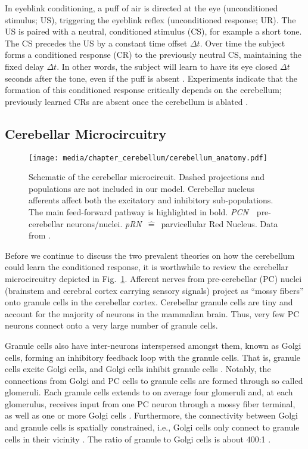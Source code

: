 In eyeblink conditioning, a puff of air is directed at the eye (unconditioned stimulus; US), triggering the eyeblink reflex (unconditioned response; UR). The US is paired with a neutral, conditioned stimulus (CS), for example a short tone. The CS precedes the US by a constant time offset $\Delta t$. Over time the subject forms a conditioned response (CR) to the previously neutral CS, maintaining the fixed delay $\Delta t$. In other words, the subject will learn to have its eye closed $\Delta t$ seconds after the tone, even if the puff is absent \citep[cf.][]{heiney2014cerebellardependent}. Experiments indicate that the formation of this conditioned response critically depends on the cerebellum; previously learned CRs are absent once the cerebellum is ablated \citep{mccormick1981engram}.

\subsection{Cerebellar Microcircuitry}

\begin{figure}[t]
	\centering
	\texttt{[image: media/chapter\_cerebellum/cerebellum\_anatomy.pdf]}
	\caption[Schematic of the cerebellar microcircuit.]{Schematic of the cerebellar microcircuit. Dashed projections and populations are not included in our model. Cerebellar nucleus afferents affect both the excitatory and inhibitory sub-populations.  The main feed-forward pathway is highlighted in bold. \emph{PCN}~\correspondsTo~pre-cerebellar neurons/nuclei. \emph{pRN}~$\hat =$~parvicellular Red Nucleus. Data from \protect\citet{ito2010cerebellar,llinas2010olivocerebellar}.}
	\label{fig:cerebellum_anatomy}
\end{figure}

Before we continue to discuss the two prevalent theories on how the cerebellum could learn the conditioned response, it is worthwhile to review the cerebellar microcircuitry depicted in Fig.~\ref{fig:cerebellum_anatomy}.
Afferent nerves from pre-cerebellar (PC) nuclei (brainstem and cerebral cortex carrying sensory signals) project as \enquote{mossy fibers} onto granule cells in the cerebellar cortex.
Cerebellar granule cells are tiny and account for the majority of neurons in the mammalian brain. Thus, very few PC neurons connect onto a very large number of granule cells.

Granule cells also have inter-neurons interspersed amongst them, known as Golgi cells, forming an inhibitory feedback loop with the granule cells. That is, granule cells excite Golgi cells, and Golgi cells inhibit granule cells \citep{ito2010cerebellar}.
Notably, the connections from Golgi and PC cells to granule cells are formed through so called glomeruli. Each granule cells extends to on average four glomeruli and, at each glomerulus, receives input from one PC neuron through a mossy fiber terminal, as well as one or more Golgi cells \citep{palkovits1972quantitative,jakab1988quantitative,chadderton2004integration}.
Furthermore, the connectivity between Golgi and granule cells is spatially constrained, i.e., Golgi cells only connect to granule cells in their vicinity \citep{dangelo2013cerebellar}. The ratio of granule to Golgi cells is about 400:1 \citep{korbo1993total}.

